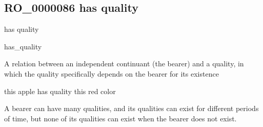 \documentclass[letterpaper,10pt,english]{sphinxmanual}
\begin{document}
\begin{sphinxShadowBox}

\sphinxAtStartPar
{}
\end{sphinxShadowBox}
\begin{quote}

\ignorespaces \end{quote}


\subsection{RO\_0000086 \sphinxhyphen{} has quality}
\label{\detokenize{doc-RO_0000086:ro-0000086-has-quality}}\label{\detokenize{doc-RO_0000086:index-0}}\label{\detokenize{doc-RO_0000086::doc}}
\begin{sphinxShadowBox}

\sphinxAtStartPar
has quality
\end{sphinxShadowBox}

\begin{sphinxShadowBox}

\sphinxAtStartPar
has\_quality
\end{sphinxShadowBox}

\begin{sphinxShadowBox}

\sphinxAtStartPar
A relation between an independent continuant (the bearer) and a quality, in which the quality specifically depends on the bearer for its existence
\end{sphinxShadowBox}

\begin{sphinxShadowBox}

\sphinxAtStartPar
this apple has quality this red color
\end{sphinxShadowBox}

\begin{sphinxShadowBox}

\sphinxAtStartPar
A bearer can have many qualities, and its qualities can exist for different periods of time, but none of its qualities can exist when the bearer does not exist.
\end{sphinxShadowBox}
\end{document}

